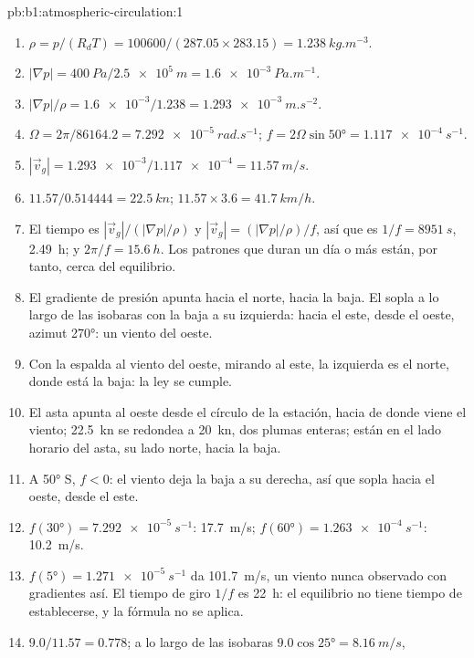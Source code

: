 \begin{solution}{pb:b1:atmospheric-circulation:1}
\begin{enumerate}
  \item $\rho = p/(R_dT) = \num{100600}/(287.05 \times 283.15) =
        \qty{1.238}{kg.m^{-3}}$.
  \item $|\nabla p| = \qty{400}{Pa}/\qty{2.5e5}{m} = \qty{1.6e-3}{Pa.m^{-1}}$.
  \item $|\nabla p|/\rho = \num{1.6e-3}/1.238 = \qty{1.293e-3}{m.s^{-2}}$.
  \item $\Omega = 2\pi/\num{86164.2} = \qty{7.292e-5}{rad.s^{-1}}$;
        $f = 2\Omega\sin\ang{50} = \qty{1.117e-4}{s^{-1}}$.
  \item $|\vec v_g| = \num{1.293e-3}/\num{1.117e-4} = \qty{11.57}{m/s}$.
  \item $11.57/0.514444 = \qty{22.5}{kn}$; $11.57 \times 3.6 = \qty{41.7}{km/h}$.
  \item El tiempo es $|\vec v_g|/(|\nabla p|/\rho)$ y $|\vec v_g| = (|\nabla
        p|/\rho)/f$, así que es $1/f = \qty{8951}{s}$, \qty{2.49}{h}; y $2\pi/f =
        \qty{15.6}{h}$. Los patrones que duran un día o más están, por tanto, cerca del equilibrio.
  \item El gradiente de presión apunta hacia el norte, hacia la baja. El  sopla a lo largo de las isobaras con la baja a su izquierda: hacia el este, desde el oeste, azimut \ang{270}: un viento del oeste.
  \item Con la espalda al viento del oeste, mirando al este, la izquierda es el norte, donde está la baja: la ley se cumple.
  \item El asta apunta al oeste desde el círculo de la estación, hacia de donde viene el viento; \qty{22.5}{kn} se redondea a \qty{20}{kn}, dos plumas enteras; están en el lado horario del asta, su lado norte, hacia la baja.
  \item A \ang{50} S, $f < 0$: el viento deja la baja a su derecha, así que sopla hacia el oeste, desde el este.
  \item $f(\ang{30}) = \qty{7.292e-5}{s^{-1}}$: \qty{17.7}{m/s}; $f(\ang{60}) =
        \qty{1.263e-4}{s^{-1}}$: \qty{10.2}{m/s}.
  \item $f(\ang{5}) = \qty{1.271e-5}{s^{-1}}$ da \qty{101.7}{m/s}, un viento nunca observado con gradientes así. El tiempo de giro $1/f$ es \qty{22}{h}:
        el equilibrio no tiene tiempo de establecerse, y la fórmula no se aplica.
  \item $9.0/11.57 = 0.778$; a lo largo de las isobaras $9.0\cos\ang{25} = \qty{8.16}{m/s}$,

\end{enumerate}
\end{solution}
